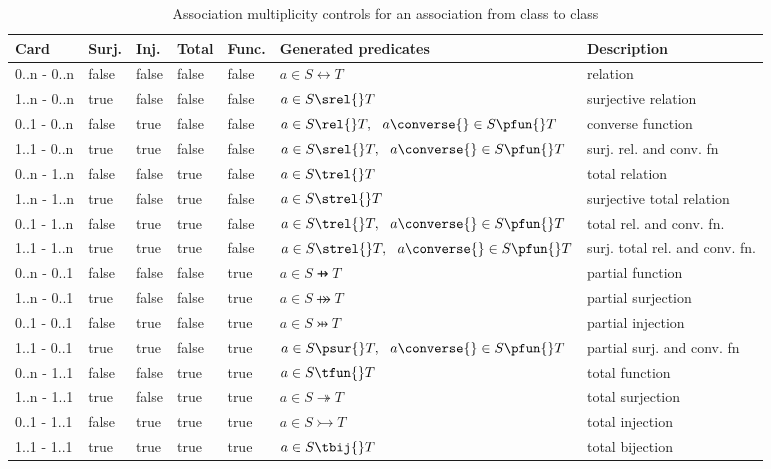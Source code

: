 \begin{table}[!htb]  
	\centering 
	\begin{tabular}{|l|l|l|l|l|l|l|} 
		\hline 
		\textbf{Card} &\textbf{Surj.} & \textbf{Inj.} & \textbf{Total} & \textbf{Func.} & \textbf{Generated predicates} & \textbf{Description}\\ 
		\hline 
		0..n - 0..n&false&false&false&false&$a \in{} S \rel{} T$&relation\\ 
		\hline 
		1..n - 0..n&true&false&false&false&$a \in{} S \srel{} T$&surjective relation\\ 
		\hline 
		0..1 - 0..n&false&true&false&false&$a \in{} S \rel{} T, ~~ a\converse{} \in{} S \pfun{} T$&converse function\\ 
		\hline 
		1..1 - 0..n&true&true&false&false&$a \in{} S \srel{} T,~~  a\converse{} \in{} S \pfun{} T$&surj. rel. and conv. fn\\ 
		\hline 
		0..n - 1..n&false&false&true&false&$a \in{} S \trel{} T$&total relation\\ 
		\hline 
		1..n - 1..n&true&false&true&false&$a \in{} S \strel{} T$&surjective total relation\\ 
		\hline 
		0..1 - 1..n&false&true&true&false&$a \in{} S \trel{} T,~~  a\converse{} \in{} S \pfun{} T$&total rel. and conv. fn.\\ 
		\hline 
		1..1 - 1..n&true&true&true&false&$a \in{} S \strel{} T,~~  a\converse{} \in{} S \pfun{} T$&surj. total rel. and conv. fn.\\ 
		\hline 
		0..n - 0..1&false&false&false&true&$a \in{} S \pfun{} T$&partial function\\ 
		\hline 
		1..n - 0..1&true&false&false&true&$a \in{} S \psur{} T$&partial surjection\\ 
		\hline 
		0..1 - 0..1&false&true&false&true&$a \in{} S \pinj{} T$&partial injection\\ 
		\hline 
		1..1 - 0..1&true&true&false&true&$a \in{} S \psur{} T,~~  a\converse{} \in{} S \pfun{} T$&partial surj. and conv. fn\\ 
		\hline 
		0..n - 1..1&false&false&true&true&$a \in{} S \tfun{} T$&total function\\ 
		\hline 
		1..n - 1..1&true&false&true&true&$a \in{} S \tsur{} T$&total surjection\\ 
		\hline 
		0..1 - 1..1&false&true&true&true&$a \in{} S \tinj{} T$&total injection\\ 
		\hline 
		1..1 - 1..1&true&true&true&true&$a \in{} S \tbij{} T$&total bijection\\ 
		\hline 
	\end{tabular} 
	\caption{Association multiplicity controls for an association  from class  to class } 
	\label{tab:AssociationMultiplicity} 
\end{table} 

